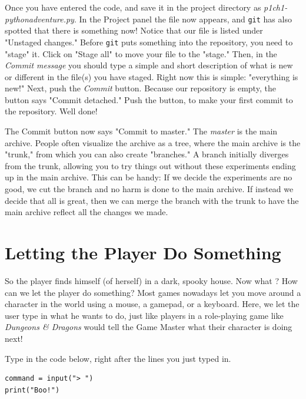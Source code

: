 Once you have entered the code, and save it in the project directory as \emph{p1ch1-pythonadventure.py}. In the Project panel the file now appears, and \texttt{git} has also spotted that there is something now! Notice that our file is listed under "Unstaged changes." Before \texttt{git} puts something into the repository, you need to "stage" it. Click on "Stage all" to move your file to the "stage." Then, in the \emph{Commit message} you should type a simple and short description of what is new or different in the file(s) you have staged. Right now this is simple: "everything is new!" Next, push the \emph{Commit} button. Because our repository is empty, the button says "Commit detached." Push the button, to make your first commit to the repository. Well done!

\begin{Exp} 
The Commit button now says "Commit to master." The \emph{master} is the main archive. People often visualize the archive as a tree, where the main archive is the "trunk," from which you can also create "branches." A branch initially diverges from the trunk, allowing you to try things out without these experiments ending up in the main archive. This can be handy: If we decide the experiments are no good, we cut the branch and no harm is done to the main archive. If instead we decide that all is great, then we can merge the branch with the trunk to have the main archive reflect all the changes we made.      \expend 
\end{Exp}
 
\section{Letting the Player Do Something}

So the player finds himself (of herself) in a dark, spooky house. Now what ? How can we let the player do something? Most games nowadays let you move around a character in the world using a mouse, a gamepad, or a keyboard. Here, we let the user type in what he wants to do, just like players in a role-playing game like \emph{Dungeons \& Dragons} would tell the Game Master what their character is doing next! 

Type in the code below, right after the lines you just typed in. 

\begin{lstlisting}[firstnumber=last]
command = input("> ")
print("Boo!")
\end{lstlisting}

